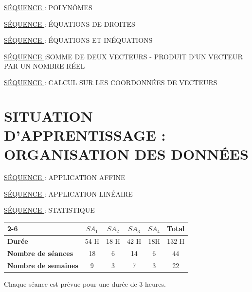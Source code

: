   \underline{SÉQUENCE } : POLYNÔMES
  
  \underline{SÉQUENCE } : ÉQUATIONS DE DROITES 
  
  \underline{SÉQUENCE } : ÉQUATIONS ET INÉQUATIONS 
  
  \underline{SÉQUENCE } :SOMME DE DEUX VECTEURS - PRODUIT D'UN VECTEUR PAR UN NOMBRE RÉEL 
  
  \underline{SÉQUENCE }: CALCUL SUR LES COORDONNÉES DE VECTEURS 
  
  \section*{SITUATION D’APPRENTISSAGE  : ORGANISATION DES DONNÉES}
  
  \underline{SÉQUENCE } : APPLICATION AFFINE
  
  \underline{SÉQUENCE } : APPLICATION LINÉAIRE
  
  \underline{SÉQUENCE } : STATISTIQUE
  
  \begin{tabular}{|l|c|c|c|c|c|}
  	\cline{2-6}
  	\multicolumn{1}{c|}{} & $SA_{1}$ & $SA_{2}$&$SA_{3}$&$SA_{4}$ &Total\\
  	\hline
  	\textbf{Durée} & 54 H& 18 H& 42 H& 18H& 132 H\\ 
  	\hline
  	\textbf{Nombre de séances} & 18 & 6& 14 & 6 &44\\
  	\hline 
  	\textbf{Nombre de semaines }& 9 & 3& 7& 3 & 22\\
  	\hline 
  \end{tabular}
  
  \vspace{0.5cm}
  Chaque séance est prévue pour une durée de 3 heures.
  \newpage
  \begin{center}
  	\resizebox{18cm}{0.8cm}{ \textcolor{black}{CONTRAT  DIDACTIQUE}}
  \end{center}
  
